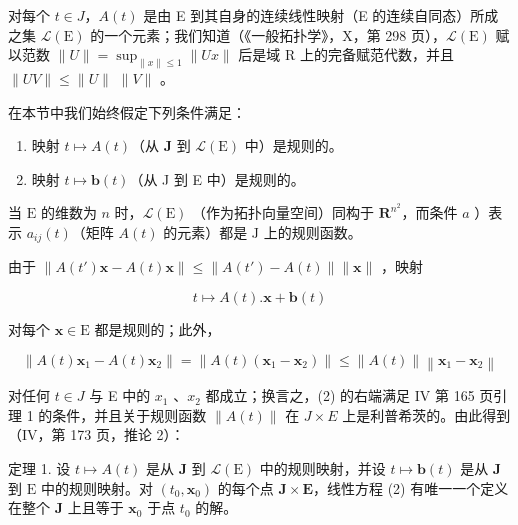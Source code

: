 对每个 \(t \in J\)，\(A(t)\) 是由 E 到其自身的连续线性映射（E 的连续自同态）所成之集 \(\mathcal{L}(\mathrm{E})\) 的一个元素；我们知道（《一般拓扑学》，X，第 298 页），\(\mathcal{L}(\mathrm{E})\) 赋以范数 \(\|U\| = \sup_{\|x\| \leqslant 1} \|Ux\|\) 后是域 R 上的完备赋范代数，并且 \(\|UV\| \leqslant \|U\|\) \(\|V\|\) 。

在本节中我们始终假定下列条件满足：

\begin{enumerate}
\def\labelenumi{\alph{enumi})}
\item
  映射 \(t \mapsto A(t)\)（从 \(\mathbf{J}\) 到 \(\mathcal{L}(\mathrm{E})\) 中）是规则的。
\item
  映射 \(t \mapsto \mathbf{b}(t)\)（从 J 到 E 中）是规则的。
\end{enumerate}

当 \(\mathrm{E}\) 的维数为 \(n\) 时，\(\mathcal{L}(\mathrm{E})\) （作为拓扑向量空间）同构于 \(\mathbf{R}^{n^2}\)，而条件 \(a\) ）表示 \(a_{ij}(t)\)（矩阵 \(A(t)\) 的元素）都是 \(\mathrm{J}\) 上的规则函数。

由于 \(\left\| A(t')\mathbf{x} - A(t)\mathbf{x}\right\| \leqslant \left\| A(t') - A(t)\right\| \| \mathbf{x}\|\) ，映射

\[
t \mapsto A (t). \mathbf {x} + \mathbf {b} (t)
\]

对每个 \(\mathbf{x} \in \mathrm{E}\) 都是规则的；此外，

\[
\left\| A (t) \mathbf {x} _ {1} - A (t) \mathbf {x} _ {2} \right\| = \left\| A (t) \left(\mathbf {x} _ {1} - \mathbf {x} _ {2}\right) \right\| \leqslant \left\| A (t) \right\| \left\| \mathbf {x} _ {1} - \mathbf {x} _ {2} \right\|
\]

对任何 \(t \in J\) 与 E 中的 \(x_{1}\) 、\(x_{2}\) 都成立；换言之，(2) 的右端满足 IV 第 165 页引理 1 的条件，并且关于规则函数 \(\|A(t)\|\) 在 \(J \times E\) 上是利普希茨的。由此得到（IV，第 173 页，推论 2）：

定理 1. 设 \(t \mapsto A(t)\) 是从 \(\mathbf{J}\) 到 \(\mathcal{L}(\mathrm{E})\) 中的规则映射，并设 \(t \mapsto \mathbf{b}(t)\) 是从 \(\mathbf{J}\) 到 \(\mathrm{E}\) 中的规则映射。对 \((t_0, \mathbf{x}_0)\) 的每个点 \(\mathbf{J} \times \mathbf{E}\)，线性方程 (2) 有唯一一个定义在整个 \(\mathbf{J}\) 上且等于 \(\mathbf{x}_0\) 于点 \(t_0\) 的解。

